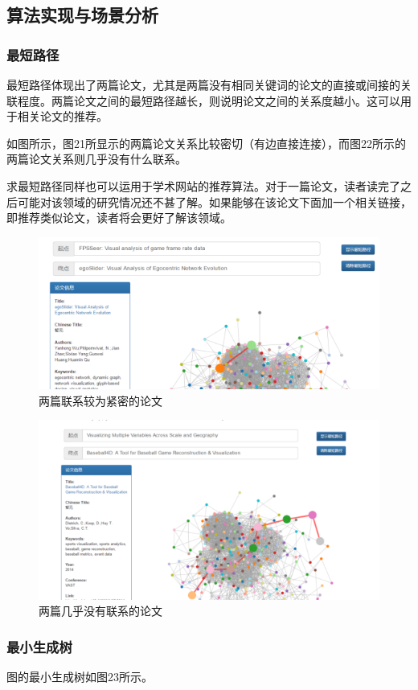 \documentclass[UTF8, onecolumn, a4paper]{article}
\begin{document}
\subsection{算法实现与场景分析}
\subsubsection{最短路径}
    最短路径体现出了两篇论文，尤其是两篇没有相同关键词的论文的直接或间接的关联程度。两篇论文之间的最短路径越长，则说明论文之间的关系度越小。这可以用于相关论文的推荐。
    
    如图所示，图21所显示的两篇论文关系比较密切（有边直接连接），而图22所示的两篇论文关系则几乎没有什么联系。

    求最短路径同样也可以运用于学术网站的推荐算法。对于一篇论文，读者读完了之后可能对该领域的研究情况还不甚了解。如果能够在该论文下面加一个相关链接，即推荐类似论文，读者将会更好了解该领域。
\begin{figure}[H]
	\centering
	\includegraphics[width=0.6\linewidth]{../pictures/show16}
	\caption{两篇联系较为紧密的论文}
\end{figure}
\begin{figure}[H]
	\centering
	\includegraphics[width=0.6\linewidth]{../pictures/show17}
	\caption{两篇几乎没有联系的论文}
\end{figure}
\subsubsection{最小生成树}
    图的最小生成树如图23所示。
  
\end{document}
